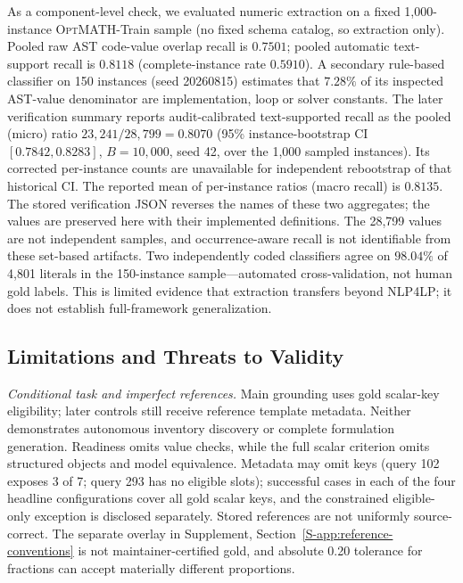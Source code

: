 \documentclass[pdflatex,sn-basic,Numbered]{sn-jnl}
\begin{document}
As a component-level check, we evaluated numeric extraction on a fixed 1,000-instance \textsc{OptMATH}-Train sample \cite{lu2025optmath} (no fixed schema catalog, so extraction only). Pooled raw AST code-value overlap recall is $0.7501$; pooled automatic text-support recall is $0.8118$ (complete-instance rate $0.5910$). A secondary rule-based classifier on 150 instances (seed 20260815) estimates that $7.28\%$ of its inspected AST-value denominator are implementation, loop or solver constants. The later verification summary reports audit-calibrated text-supported recall as the pooled (micro) ratio $23{,}241/28{,}799=0.8070$ (95\% instance-bootstrap CI $[0.7842,0.8283]$, $B=10{,}000$, seed 42, over the 1,000 sampled instances). Its corrected per-instance counts are unavailable for independent rebootstrap of that historical CI. The reported mean of per-instance ratios (macro recall) is $0.8135$. The stored verification JSON reverses the names of these two aggregates; the values are preserved here with their implemented definitions. The 28,799 values are not independent samples, and occurrence-aware recall is not identifiable from these set-based artifacts. Two independently coded classifiers agree on $98.04\%$ of 4,801 literals in the 150-instance sample---automated cross-validation, not human gold labels. This is limited evidence that extraction transfers beyond \textsc{NLP4LP}; it does not establish full-framework generalization.

\subsection{Limitations and Threats to Validity}
\label{subsec:limitations}

\emph{Conditional task and imperfect references.} Main grounding uses gold scalar-key eligibility; later controls still receive reference template metadata. Neither demonstrates autonomous inventory discovery or complete formulation generation. Readiness omits value checks, while the full scalar criterion omits structured objects and model equivalence. Metadata may omit keys (query 102 exposes 3 of 7; query 293 has no eligible slots); successful cases in each of the four headline configurations cover all gold scalar keys, and the constrained eligible-only exception is disclosed separately. Stored references are not uniformly source-correct. The separate overlay in Supplement, Section~\ref{S-app:reference-conventions} is not maintainer-certified gold, and absolute 0.20 tolerance for fractions can accept materially different proportions.
\end{document}
